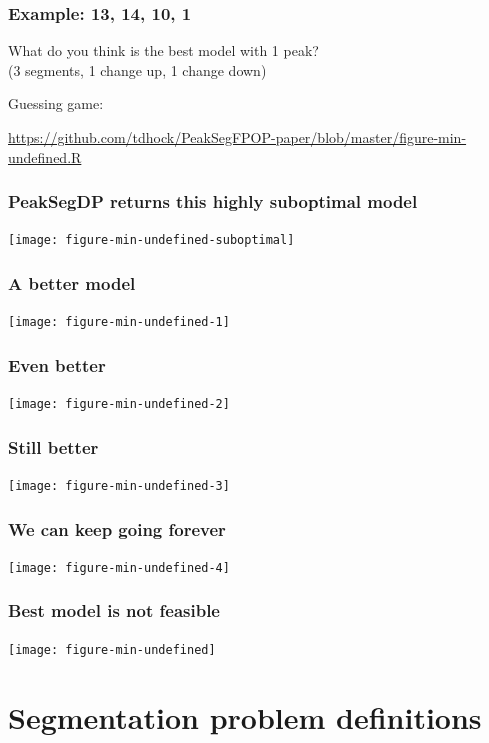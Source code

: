 \documentclass{beamer}
\begin{document}
\begin{frame}
  \frametitle{Example: 13, 14, 10, 1}
  What do you think is the best model with 1 peak?\\
  (3 segments, 1 change up, 1 change down)
  
  \vskip 1cm

  Guessing game:

  \url{https://github.com/tdhock/PeakSegFPOP-paper/blob/master/figure-min-undefined.R} 
\end{frame}

\begin{frame}
  \frametitle{PeakSegDP returns this highly suboptimal model}
  \texttt{[image: figure-min-undefined-suboptimal]}
\end{frame}

\begin{frame}
  \frametitle{A better model}
  \texttt{[image: figure-min-undefined-1]}
\end{frame}

\begin{frame}
  \frametitle{Even better}
  \texttt{[image: figure-min-undefined-2]}
\end{frame}

\begin{frame}
  \frametitle{Still better}
  \texttt{[image: figure-min-undefined-3]}
\end{frame}

\begin{frame}
  \frametitle{We can keep going forever}
  \texttt{[image: figure-min-undefined-4]}
\end{frame}

\begin{frame}
  \frametitle{Best model is not feasible}
  \texttt{[image: figure-min-undefined]}
\end{frame}

\section*{Segmentation problem definitions}
\end{document}
